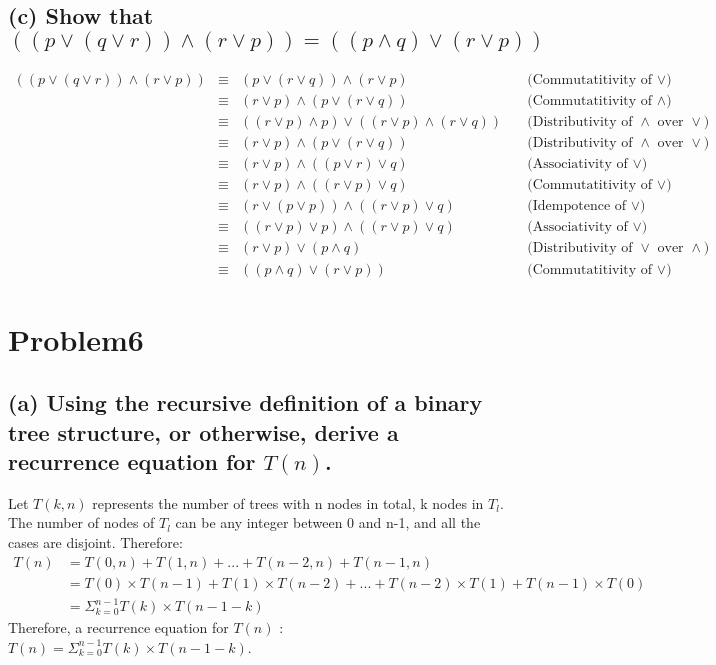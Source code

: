 \documentclass[]{article}
\begin{document}
\begin{spacing}{1.5}
	\subsection*{(c) Show that $ ((p \vee  (q\vee r)) \wedge  (r\vee p)) = ((p\wedge q) \vee  (r\vee p)) $}
	\[\begin{array}{rclr}
		((p \vee  (q\vee r)) \wedge  (r\vee p))&\equiv& (p \vee  (r \vee  q)) \wedge  (r \vee  p) &\quad\text{(Commutatitivity of $\vee$)}\\
		&\equiv& (r \vee  p) \wedge  (p \vee  (r \vee  q)) &\quad\text{(Commutatitivity of $\wedge$)}\\
		&\equiv& ((r \vee  p) \wedge  p) \vee  ((r \vee  p) \wedge  (r \vee  q)) &\quad\text{(Distributivity of $\wedge$ over $\vee$)}\\
		&\equiv& (r \vee  p) \wedge  (p \vee  (r \vee  q)) &\quad\text{(Distributivity of $\wedge$ over $\vee$)}\\
		&\equiv& (r \vee  p) \wedge  ((p \vee  r) \vee  q) &\quad\text{(Associativity of $\vee$)}\\
		&\equiv& (r \vee  p) \wedge  ((r \vee  p) \vee  q) &\quad\text{(Commutatitivity of $\vee$)}\\
		&\equiv& (r \vee  (p \vee  p)) \wedge  ((r \vee  p) \vee  q) &\quad\text{(Idempotence of $\vee$)}\\
		&\equiv& ((r \vee  p) \vee  p) \wedge  ((r \vee  p) \vee  q) &\quad\text{(Associativity of $\vee$)}\\
		&\equiv& (r \vee  p) \vee  (p \wedge  q) &\quad\text{(Distributivity of $\vee$ over $\wedge$)}\\
		&\equiv& ((p\wedge q) \vee  (r\vee p)) &\quad\text{(Commutatitivity of $\vee$)}
	\end{array}\]


	\section*{Problem6}
	\subsection*{(a) Using the recursive definition of a binary tree structure, or otherwise, derive a recurrence equation for $  T(n) $.}
	Let $ T(k,n) $ represents the number of trees with n nodes in total, k nodes in $ T_l $. The number of nodes of $ T_l $ can be any integer between 0 and n-1, and all the cases are disjoint. Therefore:
	\[
	\begin{array}{rl}
		T(n) &= T(0,n) + T(1,n) + ... + T(n-2,n) + T(n-1,n)\\
		&= T(0) \times T(n-1) + T(1) \times T(n-2)  + ... + T(n-2) \times T(1) + T(n-1) \times T(0) \\
		&= \Sigma_{k=0}^{n-1}T(k) \times T(n-1-k) 
	\end{array}
	\]
	Therefore, a recurrence equation for $ T(n) $ : $T(n)=\Sigma_{k=0}^{n-1}T(k) \times T(n-1-k)   $.
	

\end{spacing}
\end{document}
